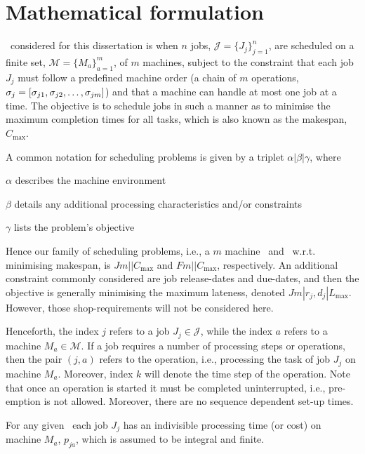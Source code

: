 \section{Mathematical formulation}\label{jsp:MIP}
\Jsp\ considered for this dissertation is when $n$ jobs, 
$\mathcal{J}=\{J_j\}_{j=1}^n$, are scheduled on a finite set, 
$\mathcal{M}=\{M_a\}_{a=1}^m$, of $m$ machines, subject to the constraint that 
each job $J_j$ must follow a predefined machine order (a chain of 
$m$ operations, ${\mathbf{\sigma}}_j=[\sigma_{j1},\sigma_{j2},\dotsc,\sigma_{jm}]$) and 
that a machine can handle at most one job at a time. 
The objective is to schedule jobs in such a manner as to minimise the maximum 
completion times for all tasks, which is also known as the makespan, 
$C_{\max}$. 

A common notation for scheduling problems \citep[cf. Chapter 2 in ][]{Pinedo08} 
is given by a triplet $\alpha|\beta|\gamma$, where 
\begin{enumerate*}[itemjoin*={, and finally}, label={{}}]
    \item $\alpha$ describes the machine environment
    \item $\beta$ details any additional processing characteristics and/or 
    constraints
    \item $\gamma$ lists the problem's objective
\end{enumerate*}
Hence our family of scheduling problems, i.e., a $m$ machine \JSP\ and \FSP\ 
w.r.t. minimising makespan, is $Jm||C_{\max}$ and $Fm||C_{\max}$, respectively. 
An additional constraint commonly considered are job release-dates and 
due-dates, and then the objective is generally minimising the maximum lateness, 
denoted $Jm|r_j,d_j|L_{\max}$. 
However, those shop-requirements will not be considered here. 

Henceforth, the index $j$ refers to a job $J_j\in\mathcal{J}$, while the index 
$a$ refers to a machine $M_a\in\mathcal{M}$. If a job requires a number of 
processing steps or operations, then the pair $(j,a)$ refers to the operation, 
i.e., processing the task of job $J_j$ on machine $M_a$. Moreover, index $k$ 
will denote the time step of the operation. Note that once an operation is 
started it must be completed uninterrupted, i.e., pre-emption is not allowed. 
Moreover, there are no sequence dependent set-up times.

For any given \JSP\ each job $J_j$ has an indivisible processing time (or 
cost) on machine $M_a$, $p_{ja}$, which is assumed to be integral and finite. 

